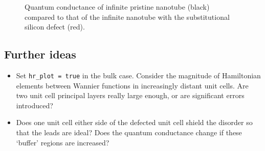 \documentclass[a4paper,11pt,twoside]{article}
\begin{document}
\begin{figure}[h]
\begin{center}
\caption{Quantum conductance of infinite pristine nanotube (black) 
compared to that of the infinite nanotube with the substitutional silicon 
defect (red).}
\label{fig:cnt_qc}
\end{center}
\end{figure}

\subsection*{Further ideas}
\begin{itemize}
\item Set {\tt hr\_plot = true} in the bulk case. Consider the magnitude of Hamiltonian 
	elements between Wannier functions in increasingly distant unit cells. Are two 
	unit cell principal layers really large enough, or are significant errors introduced?
\item Does one unit cell either side of the defected unit cell shield the disorder
	so that the leads are ideal? Does the quantum conductance change if these 
	`buffer' regions are increased?
\end{itemize}

\cleardoublepage
\end{document}
